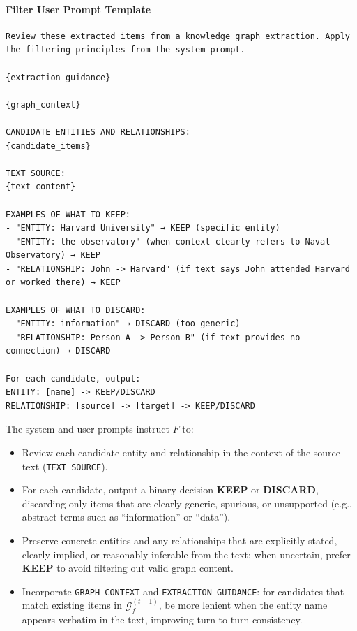 \paragraph{Filter User Prompt Template}
\begin{tcolorbox}[
  title={User prompt template for Graph Filter Agent},
  colback=gray!3,
  colframe=gray!40,
  boxrule=0.5pt,
  arc=2pt,
  left=5pt,right=5pt,top=4pt,bottom=4pt,
  breakable
]\label{filter_user_prompt}
\begin{Verbatim}[fontsize=\footnotesize, breaklines=true, breakanywhere=true, breaksymbolleft={}]
Review these extracted items from a knowledge graph extraction. Apply the filtering principles from the system prompt.

{extraction_guidance}

{graph_context}

CANDIDATE ENTITIES AND RELATIONSHIPS:
{candidate_items}

TEXT SOURCE:
{text_content}

EXAMPLES OF WHAT TO KEEP:
- "ENTITY: Harvard University" → KEEP (specific entity)
- "ENTITY: the observatory" (when context clearly refers to Naval Observatory) → KEEP
- "RELATIONSHIP: John -> Harvard" (if text says John attended Harvard or worked there) → KEEP

EXAMPLES OF WHAT TO DISCARD:
- "ENTITY: information" → DISCARD (too generic)
- "RELATIONSHIP: Person A -> Person B" (if text provides no connection) → DISCARD

For each candidate, output:
ENTITY: [name] -> KEEP/DISCARD
RELATIONSHIP: [source] -> [target] -> KEEP/DISCARD
\end{Verbatim}
\end{tcolorbox}


The system and user prompts instruct $F$ to:

\begin{itemize}
    \item Review each candidate entity and relationship in the context of the source text (\texttt{TEXT SOURCE}).
    \item For each candidate, output a binary decision \textbf{KEEP} or \textbf{DISCARD}, discarding only items that are clearly generic, spurious, or unsupported (e.g., abstract terms such as ``information'' or ``data'').
    \item Preserve concrete entities and any relationships that are explicitly stated, clearly implied, or reasonably inferable from the text; when uncertain, prefer \textbf{KEEP} to avoid filtering out valid graph content.
    \item Incorporate \texttt{GRAPH CONTEXT} and \texttt{EXTRACTION GUIDANCE}: for candidates that match existing items in $\mathcal{G}_f^{(t-1)}$, be more lenient when the entity name appears verbatim in the text, improving turn-to-turn consistency.
\end{itemize}

